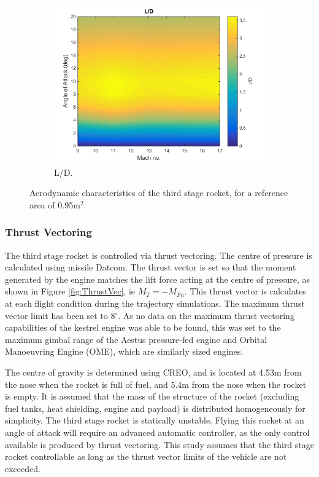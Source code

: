 \begin{figure}
\begin{subfigure}{.5\textwidth}
				\includegraphics[width=0.99\linewidth]{figures/3_vehicle_design/ThirdStageLD}
				\caption{L/D.}
				\label{fig:LD-ThirdStage}
			\end{subfigure}
			\caption{Aerodynamic characteristics of the third stage rocket, for a reference area of 0.95m$^2$.}
			\label{fig:ThirdStageAero}
		\end{figure}
		
		
		
		\subsubsection{Thrust Vectoring}\label{sec:thrustvectoring}
		
		The third stage rocket is controlled via thrust vectoring. The centre of pressure is calculated using missile Datcom. The thrust vector is set so that the moment generated by the engine matches the lift force acting at the centre of pressure, as shown in Figure \ref{fig:ThrustVec}, ie $M_{T} = -M_{Fn}$. This thrust vector is calculates at each flight condition during the trajectory simulations. The maximum thrust vector limit has been set to 8$^\circ$. As no data on the maximum thrust vectoring capabilities of the kestrel engine was able to be found, this was set to the maximum gimbal range of the Aestus pressure-fed engine and Orbital Manoeuvring Engine (OME), which are similarly sized engines\cite{Wade2017}.
		
			The centre of gravity is determined using CREO, and is located at 4.53m from the nose when the rocket is full of fuel, and 5.4m from the nose when the rocket is empty. It is assumed that the mass of the structure of the rocket (excluding fuel tanks, heat shielding, engine and payload) is distributed homogeneously for simplicity.
		The third stage rocket is statically unstable. Flying this rocket at an angle of attack will require an advanced automatic controller, as the only control available is produced by thrust vectoring. This study assumes that the third stage rocket controllable as long as the thrust vector limits of the vehicle are not exceeded. 
		
